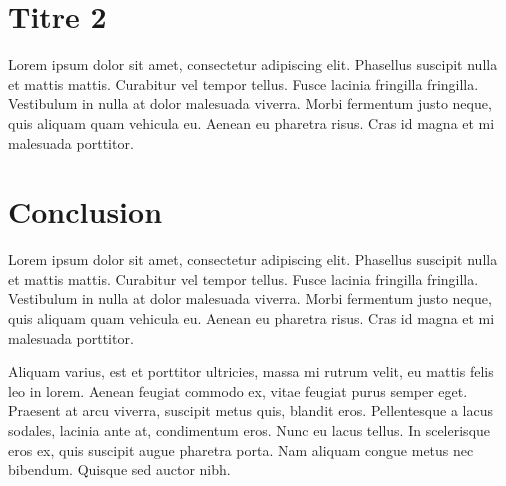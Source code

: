 \section{Titre 2}
Lorem ipsum dolor sit amet, consectetur adipiscing elit. Phasellus suscipit nulla et mattis mattis. Curabitur vel tempor tellus. 
Fusce lacinia fringilla fringilla. Vestibulum in nulla at dolor malesuada viverra. Morbi fermentum justo neque, quis aliquam quam vehicula eu. 
Aenean eu pharetra risus. Cras id magna et mi malesuada porttitor.

\section{Conclusion}
Lorem ipsum dolor sit amet, consectetur adipiscing elit. Phasellus suscipit nulla et mattis mattis. Curabitur vel tempor tellus. 
Fusce lacinia fringilla fringilla. Vestibulum in nulla at dolor malesuada viverra. Morbi fermentum justo neque, quis aliquam quam vehicula eu. 
Aenean eu pharetra risus. Cras id magna et mi malesuada porttitor.

Aliquam varius, est et porttitor ultricies, massa mi rutrum velit, eu mattis felis leo in lorem. 
Aenean feugiat commodo ex, vitae feugiat purus semper eget. Praesent at arcu viverra, suscipit metus quis, blandit eros. 
Pellentesque a lacus sodales, lacinia ante at, condimentum eros. Nunc eu lacus tellus. In scelerisque eros ex, quis suscipit augue pharetra porta. 
Nam aliquam congue metus nec bibendum. Quisque sed auctor nibh.
